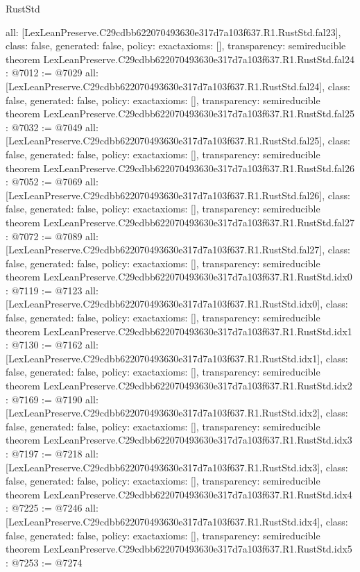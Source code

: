 \begin{lexlean}{RustStd}
\begin{coremodule}
{  all: [LexLeanPreserve.C29cdbb622070493630e317d7a103f637.R1.RustStd.fal23],
  class: false,
  generated: false,
  policy: exact{axioms: []},
  transparency: semireducible
}
theorem LexLeanPreserve.C29cdbb622070493630e317d7a103f637.R1.RustStd.fal24 : @7012 := @7029 {
  all: [LexLeanPreserve.C29cdbb622070493630e317d7a103f637.R1.RustStd.fal24],
  class: false,
  generated: false,
  policy: exact{axioms: []},
  transparency: semireducible
}
theorem LexLeanPreserve.C29cdbb622070493630e317d7a103f637.R1.RustStd.fal25 : @7032 := @7049 {
  all: [LexLeanPreserve.C29cdbb622070493630e317d7a103f637.R1.RustStd.fal25],
  class: false,
  generated: false,
  policy: exact{axioms: []},
  transparency: semireducible
}
theorem LexLeanPreserve.C29cdbb622070493630e317d7a103f637.R1.RustStd.fal26 : @7052 := @7069 {
  all: [LexLeanPreserve.C29cdbb622070493630e317d7a103f637.R1.RustStd.fal26],
  class: false,
  generated: false,
  policy: exact{axioms: []},
  transparency: semireducible
}
theorem LexLeanPreserve.C29cdbb622070493630e317d7a103f637.R1.RustStd.fal27 : @7072 := @7089 {
  all: [LexLeanPreserve.C29cdbb622070493630e317d7a103f637.R1.RustStd.fal27],
  class: false,
  generated: false,
  policy: exact{axioms: []},
  transparency: semireducible
}
theorem LexLeanPreserve.C29cdbb622070493630e317d7a103f637.R1.RustStd.idx0 : @7119 := @7123 {
  all: [LexLeanPreserve.C29cdbb622070493630e317d7a103f637.R1.RustStd.idx0],
  class: false,
  generated: false,
  policy: exact{axioms: []},
  transparency: semireducible
}
theorem LexLeanPreserve.C29cdbb622070493630e317d7a103f637.R1.RustStd.idx1 : @7130 := @7162 {
  all: [LexLeanPreserve.C29cdbb622070493630e317d7a103f637.R1.RustStd.idx1],
  class: false,
  generated: false,
  policy: exact{axioms: []},
  transparency: semireducible
}
theorem LexLeanPreserve.C29cdbb622070493630e317d7a103f637.R1.RustStd.idx2 : @7169 := @7190 {
  all: [LexLeanPreserve.C29cdbb622070493630e317d7a103f637.R1.RustStd.idx2],
  class: false,
  generated: false,
  policy: exact{axioms: []},
  transparency: semireducible
}
theorem LexLeanPreserve.C29cdbb622070493630e317d7a103f637.R1.RustStd.idx3 : @7197 := @7218 {
  all: [LexLeanPreserve.C29cdbb622070493630e317d7a103f637.R1.RustStd.idx3],
  class: false,
  generated: false,
  policy: exact{axioms: []},
  transparency: semireducible
}
theorem LexLeanPreserve.C29cdbb622070493630e317d7a103f637.R1.RustStd.idx4 : @7225 := @7246 {
  all: [LexLeanPreserve.C29cdbb622070493630e317d7a103f637.R1.RustStd.idx4],
  class: false,
  generated: false,
  policy: exact{axioms: []},
  transparency: semireducible
}
theorem LexLeanPreserve.C29cdbb622070493630e317d7a103f637.R1.RustStd.idx5 : @7253 := @7274 {
}
\end{coremodule}
\end{lexlean}
